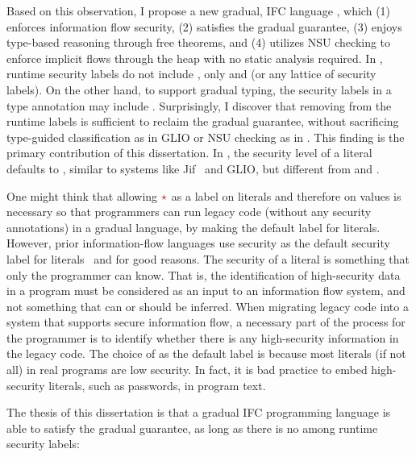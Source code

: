 Based on this observation, I propose a new gradual, IFC language \Surface, which
(1) enforces information flow security, (2) satisfies the gradual guarantee, (3)
enjoys type-based reasoning through free theorems, and (4) utilizes NSU checking
to enforce implicit flows through the heap with no static analysis required. In
\Surface, runtime security labels do not include \unk, only \low and \high (or
any lattice of security labels). On the other hand, to support gradual typing,
the security labels in a type annotation may include \unk. Surprisingly, I
discover that removing \unk from the runtime labels is sufficient to reclaim the
gradual guarantee, without sacrificing type-guided classification as in GLIO or
NSU checking as in \WHILEG. This finding is the primary contribution of this
dissertation. In \Surface, the security level of a literal defaults to \low,
similar to systems like Jif~\parencite{Myers:2006aa} and GLIO, but different
from \GSLRef and \WHILEG.

One might think that allowing $\unk$ as a label on literals and therefore on
values is necessary so that programmers can run legacy code (without any
security annotations) in a gradual language, by making \unk the default label
for literals. However, prior information-flow languages use \low security as the
default security label for literals~\parencite{Myers:2006aa} and for good
reasons. The security of a literal is something that only the programmer can
know. That is, the identification of high-security data in a program must be
considered as an input to an information flow system, and not something that can
or should be inferred. When migrating legacy code into a system that supports
secure information flow, a necessary part of the process for the programmer is
to identify whether there is any high-security information in the legacy code.
The choice of \low as the default label is because most literals (if not all) in
real programs are low security. In fact, it is bad practice to embed
high-security literals, such as passwords, in program text.

The thesis of this dissertation is that a gradual IFC programming
language is able to satisfy the gradual guarantee, as long as there is no \unk
among runtime security labels:

\vspace{20pt}

